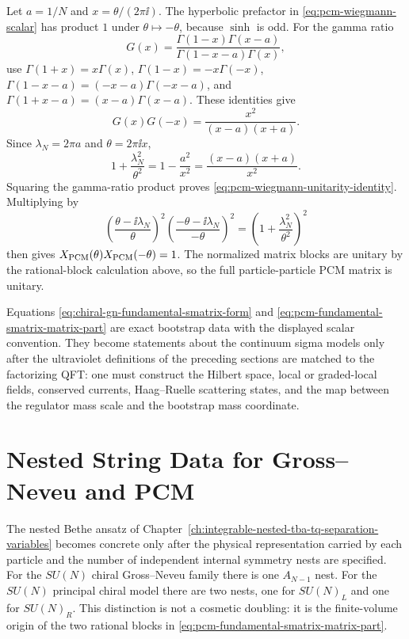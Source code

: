 Let \(a=1/N\) and \(x=\theta/(2\pi\ii)\).  The hyperbolic prefactor in
\eqref{eq:pcm-wiegmann-scalar} has product \(1\) under
\(\theta\mapsto-\theta\), because \(\sinh\) is odd.  For the gamma ratio
\[
  G(x)=
  \frac{\Gamma(1-x)\Gamma(x-a)}
       {\Gamma(1-x-a)\Gamma(x)},
\]
use \(\Gamma(1+x)=x\Gamma(x)\),
\(\Gamma(1-x)=-x\Gamma(-x)\),
\(\Gamma(1-x-a)=(-x-a)\Gamma(-x-a)\), and
\(\Gamma(1+x-a)=(x-a)\Gamma(x-a)\).  These identities give
\[
  G(x)G(-x)=\frac{x^2}{(x-a)(x+a)}.
\]
Since \(\lambda_N=2\pi a\) and \(\theta=2\pi\ii x\),
\[
  1+\frac{\lambda_N^2}{\theta^2}
  =
  1-\frac{a^2}{x^2}
  =
  \frac{(x-a)(x+a)}{x^2}.
\]
Squaring the gamma-ratio product proves
\eqref{eq:pcm-wiegmann-unitarity-identity}.  Multiplying by
\[
  \left(\frac{\theta-\ii\lambda_N}{\theta}\right)^2
  \left(\frac{-\theta-\ii\lambda_N}{-\theta}\right)^2
  =
  \left(1+\frac{\lambda_N^2}{\theta^2}\right)^2
\]
then gives \(X_{\rm PCM}(\theta)X_{\rm PCM}(-\theta)=1\).  The normalized
matrix blocks are unitary by the rational-block calculation above, so the full
particle-particle PCM matrix is unitary.

Equations \eqref{eq:chiral-gn-fundamental-smatrix-form} and
\eqref{eq:pcm-fundamental-smatrix-matrix-part} are exact bootstrap data with
the displayed scalar convention.  They become statements about the continuum
sigma models only after the ultraviolet definitions of the preceding sections
are matched to the factorizing QFT: one must construct the Hilbert space,
local or graded-local fields, conserved currents, Haag--Ruelle scattering
states, and the map between the regulator mass scale and the bootstrap mass
coordinate.

\section{Nested String Data for Gross--Neveu and PCM}
\label{sec:su-n-gn-pcm-nested-string-data}

The nested Bethe ansatz of
Chapter~\ref{ch:integrable-nested-tba-tq-separation-variables} becomes concrete
only after the physical representation carried by each particle and the number
of independent internal symmetry nests are specified.  For the \(SU(N)\) chiral
Gross--Neveu family there is one \(A_{N-1}\) nest.  For the \(SU(N)\) principal
chiral model there are two nests, one for \(SU(N)_L\) and one for \(SU(N)_R\).
This distinction is not a cosmetic doubling: it is the finite-volume origin of
the two rational blocks in
\eqref{eq:pcm-fundamental-smatrix-matrix-part}.

